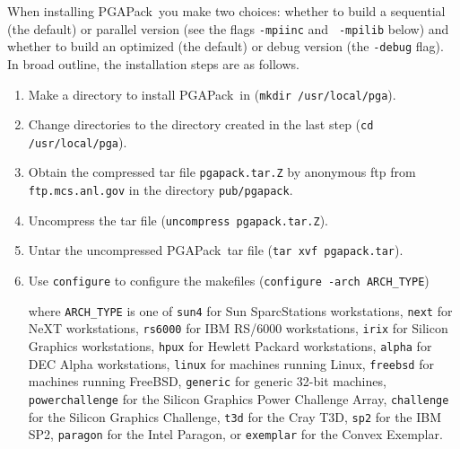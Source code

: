 \documentclass{report}
\newcommand{\pga}{PGAPack}
\begin{document}
When installing \pga\ you make two choices: whether to build a sequential (the
default) or parallel version (see the flags {\tt-mpiinc} and {\tt
-mpilib} below) and whether to build an optimized (the default) or debug
version (the {\tt -debug} flag).  In broad outline, the installation steps
are as follows.
\begin{enumerate}
\item Make a directory to install \pga\ in ({\tt mkdir /usr/local/pga}).
\item Change directories to the directory created in the last step
({\tt cd /usr/local/pga}).
\item Obtain the compressed tar file {\tt pgapack.tar.Z} by anonymous ftp from
{\tt ftp.mcs.anl.gov} in the directory {\tt pub/pgapack}.
\item Uncompress the tar file ({\tt uncompress pgapack.tar.Z}).
\item Untar the uncompressed \pga\ tar file
({\tt tar xvf pgapack.tar}).
\item Use {\tt configure} to configure the makefiles
({\tt configure -arch ARCH\_TYPE})

where {\tt ARCH\_TYPE} is one of
{\tt sun4} for Sun SparcStations workstations,
{\tt next} for NeXT workstations,
{\tt rs6000} for IBM RS/6000 workstations,
{\tt irix} for Silicon Graphics workstations,
{\tt hpux} for Hewlett Packard workstations,
{\tt alpha} for DEC Alpha workstations,
{\tt linux} for machines running Linux,
{\tt freebsd} for machines running FreeBSD,
{\tt generic} for generic 32-bit machines, 
{\tt powerchallenge} for the Silicon Graphics Power Challenge Array,
{\tt challenge} for the Silicon Graphics Challenge,
{\tt t3d} for the Cray T3D,
{\tt sp2} for the IBM SP2,
{\tt paragon} for the Intel Paragon,
or
{\tt exemplar} for the Convex  Exemplar.


\end{enumerate}
\end{document}
